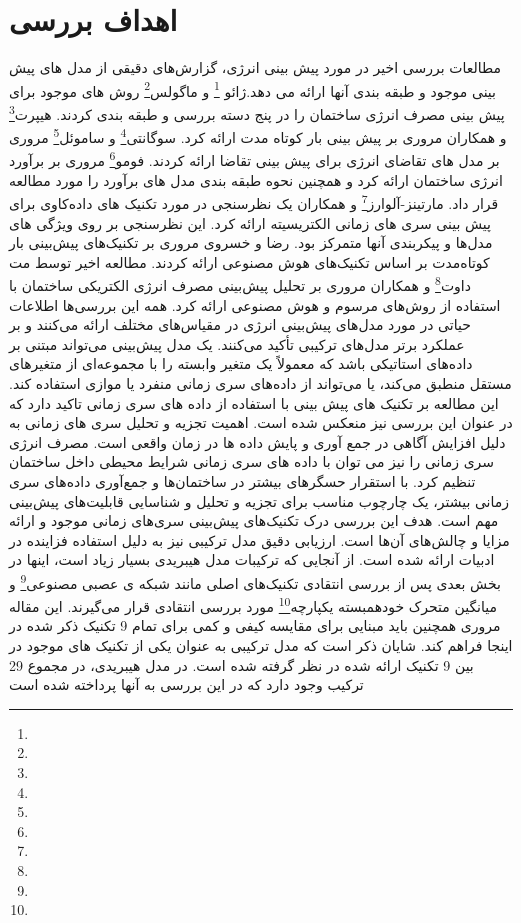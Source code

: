 \section[اهداف بررسی]{اهداف بررسی\cite{DEB2017902}}
مطالعات بررسی اخیر در مورد پیش بینی انرژی، گزارش‌های دقیقی از مدل های پیش بینی موجود و طبقه بندی آنها ارائه می دهد.ژائو \footnote{} و ماگولس\footnote{} روش های موجود برای پیش بینی مصرف انرژی ساختمان را در پنج دسته بررسی و طبقه بندی کردند. هیپرت\footnote{} و همکاران مروری بر پیش بینی بار کوتاه مدت ارائه کرد. سوگانتی\footnote{} و ساموئل\footnote{} مروری بر مدل های تقاضای انرژی برای پیش بینی تقاضا ارائه کردند. فومو\footnote{} مروری بر برآورد انرژی ساختمان ارائه کرد و همچنین نحوه طبقه بندی مدل های برآورد را مورد مطالعه قرار داد. مارتینز-آلوارز\footnote{} و همکاران یک نظرسنجی در مورد تکنیک های داده‌کاوی برای پیش بینی سری های زمانی الکتریسیته ارائه کرد. این نظرسنجی بر روی ویژگی های مدل‌ها و پیکربندی آنها متمرکز بود. رضا و خسروی مروری بر تکنیک‌های پیش‌بینی بار کوتاه‌مدت بر اساس تکنیک‌های هوش مصنوعی ارائه کردند. مطالعه اخیر توسط مت داوت\footnote{} و همکاران مروری بر تحلیل پیش‌بینی مصرف انرژی الکتریکی ساختمان با استفاده از روش‌های مرسوم و هوش مصنوعی ارائه کرد. 
همه این بررسی‌ها اطلاعات حیاتی در مورد مدل‌های پیش‌بینی انرژی در مقیاس‌های مختلف ارائه می‌کنند و بر عملکرد برتر مدل‌های ترکیبی تأکید می‌کنند. یک مدل پیش‌بینی می‌تواند مبتنی بر داده‌های استاتیکی باشد که معمولاً یک متغیر وابسته را با مجموعه‌ای از متغیرهای مستقل منطبق می‌کند، یا می‌تواند از داده‌های سری زمانی منفرد یا موازی استفاده کند. این مطالعه بر تکنیک های پیش بینی با استفاده از داده های سری زمانی تاکید دارد که در عنوان این بررسی نیز منعکس شده است. اهمیت تجزیه و تحلیل سری های زمانی به دلیل افزایش آگاهی در جمع آوری و پایش داده ها در زمان واقعی است. مصرف انرژی سری زمانی را نیز می توان با داده های سری زمانی شرایط محیطی داخل ساختمان تنظیم کرد. با استقرار حسگرهای بیشتر در ساختمان‌ها و جمع‌آوری داده‌های سری زمانی بیشتر، یک چارچوب مناسب برای تجزیه و تحلیل و شناسایی قابلیت‌های پیش‌بینی مهم است. هدف این بررسی درک تکنیک‌های پیش‌بینی سری‌های زمانی موجود و ارائه مزایا و چالش‌های آن‌ها است. ارزیابی دقیق مدل ترکیبی نیز به دلیل استفاده فزاینده در ادبیات ارائه شده است. از آنجایی که ترکیبات مدل هیبریدی بسیار زیاد است، اینها در بخش بعدی پس از بررسی انتقادی تکنیک‌های اصلی مانند شبکه ی عصبی مصنوعی\footnote{} و میانگین متحرک خودهمبسته یکپارچه\footnote{} مورد بررسی انتقادی قرار می‌گیرند. این مقاله مروری همچنین باید مبنایی برای مقایسه کیفی و کمی برای تمام 9 تکنیک ذکر شده در اینجا فراهم کند. شایان ذکر است که مدل ترکیبی به عنوان یکی از تکنیک های موجود در بین 9 تکنیک ارائه شده در نظر گرفته شده است. در مدل هیبریدی، در مجموع 29 ترکیب وجود دارد که در این بررسی به آنها پرداخته شده است
